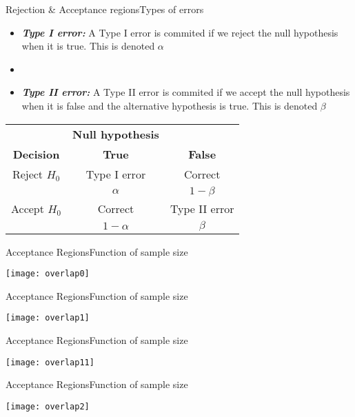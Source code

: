 \documentclass[xcolor=dvipsnames]{beamer}
\begin{document}
\begin{frame}{Rejection \& Acceptance regions}{Types of errors}
	\begin{itemize}
		\item \textbf{\emph{Type I error:}} A Type I error is commited if we reject the null hypothesis when it is true. This is denoted $\alpha$
		\item[]
		\item \textbf{\emph{Type II error:}} A Type II error is commited if we accept the null hypothesis when it is false and the alternative hypothesis is true. This is denoted $\beta$
	\end{itemize}
	\begin{center}
		\begin{tabular}{c|cc}
			& \textbf{Null hypothesis} & \\
			\textbf{Decision} & \textbf{True} & \textbf{False} \\ \hline
			Reject $H_0$ & Type I error & Correct \\
			& $\alpha$ & $1-\beta$ \\ \hline
			Accept $H_0$ & Correct & Type II error \\
			& $1-\alpha$ & $\beta$ \\ \hline
		\end{tabular}
	\end{center}
\end{frame}

\begin{frame}{Acceptance Regions}{Function of sample size}
	\begin{center}
		\texttt{[image: overlap0]}
	\end{center}
\end{frame}

\begin{frame}{Acceptance Regions}{Function of sample size}
	\begin{center}
		\texttt{[image: overlap1]}
	\end{center}
\end{frame}

\begin{frame}{Acceptance Regions}{Function of sample size}
	\begin{center}
		\texttt{[image: overlap11]}
	\end{center}
\end{frame}

\begin{frame}{Acceptance Regions}{Function of sample size}
	\begin{center}
		\texttt{[image: overlap2]}
	\end{center}
\end{frame}
\end{document}
